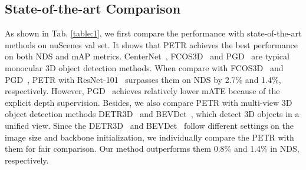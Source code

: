\documentclass[runningheads]{llncs}
\begin{document}
\subsection{State-of-the-art Comparison}
As shown in Tab. \ref{table:1}, we first compare the performance with state-of-the-art methods on nuScenes val set. It shows that PETR achieves the best performance on both NDS and mAP metrics. CenterNet~\cite{zhou2019objects}, FCOS3D~\cite{wang2021fcos3d} and PGD~\cite{wang2022pgd} are typical monocular 3D object detection methods. When compare with FCOS3D~\cite{wang2021fcos3d} and PGD~\cite{wang2022pgd}, PETR with ResNet-101~\cite{he2016resnet} surpasses them on NDS by 2.7\% and 1.4\%, respectively. However, PGD~\cite{wang2022pgd} achieves relatively lower mATE because of the explicit depth supervision. Besides, we also compare PETR with multi-view 3D object detection methods DETR3D~\cite{wang2022detr3d} and BEVDet~\cite{huang2021bevdet}, which detect 3D objects in a unified view. Since the DETR3D~\cite{wang2022detr3d} and BEVDet~\cite{huang2021bevdet} follow different settings on the image size and backbone initialization, we individually compare the PETR with them for fair comparison. Our method outperforms them 0.8\% and 1.4\% in NDS, respectively. 
\end{document}
